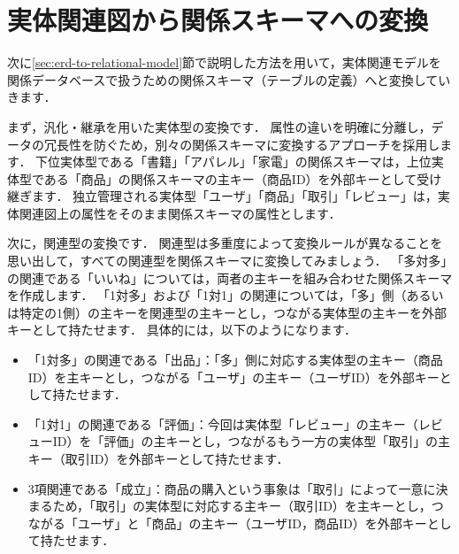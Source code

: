 \section{実体関連図から関係スキーマへの変換}
次に\ref{sec:erd-to-relational-model}節で説明した方法を用いて，実体関連モデルを関係データベースで扱うための関係スキーマ（テーブルの定義）へと変換していきます．

まず，汎化・継承を用いた実体型の変換です．
属性の違いを明確に分離し，データの冗長性を防ぐため，別々の関係スキーマに変換するアプローチを採用します．
下位実体型である「書籍」「アパレル」「家電」の関係スキーマは，上位実体型である「商品」の関係スキーマの主キー（商品ID）を外部キーとして受け継ぎます．
独立管理される実体型「ユーザ」「商品」「取引」「レビュー」は，実体関連図上の属性をそのまま関係スキーマの属性とします．

次に，関連型の変換です．
関連型は多重度によって変換ルールが異なることを思い出して，すべての関連型を関係スキーマに変換してみましょう．
「多対多」の関連である「いいね」については，両者の主キーを組み合わせた関係スキーマを作成します．
「1対多」および「1対1」の関連については，「多」側（あるいは特定の1側）の主キーを関連型の主キーとし，つながる実体型の主キーを外部キーとして持たせます．
具体的には，以下のようになります．
\begin{itemize}
\item 「1対多」の関連である「出品」：「多」側に対応する実体型の主キー（商品ID）を主キーとし，つながる「ユーザ」の主キー（ユーザID）を外部キーとして持たせます．
\item 「1対1」の関連である「評価」：今回は実体型「レビュー」の主キー（レビューID）を「評価」の主キーとし，つながるもう一方の実体型「取引」の主キー（取引ID）を外部キーとして持たせます．
\item 3項関連である「成立」：商品の購入という事象は「取引」によって一意に決まるため，「取引」の実体型に対応する主キー（取引ID）を主キーとし，つながる「ユーザ」と「商品」の主キー（ユーザID，商品ID）を外部キーとして持たせます．
\end{itemize}

